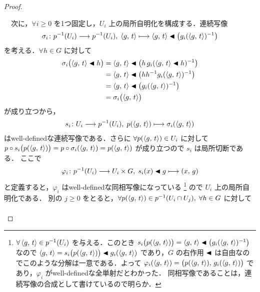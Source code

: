 \documentclass[TQFT_main]{subfiles}
\begin{document}
\begin{proof}
\begin{description}
        　次に，$\forall i \ge 0$ を1つ固定し，$U_i$ 上の局所自明化を構成する．連続写像
        \begin{align}
            \sigma_i \colon p^{-1}(U_i) \longrightarrow p^{-1}(U_i),\; \expval{g,\, t} \longmapsto \expval{g,\, t} \blacktriangleleft \bigl(g_i (\expval{g,\, t})^{-1}\bigr)
        \end{align}
        を考える．$\forall h \in G$ に対して
        \begin{align}
            \sigma_i \bigl( \expval{g,\, t} \blacktriangleleft h \bigr)  
            &= \expval{g,\, t} \blacktriangleleft \bigl(h\, g_i (\expval{g,\, t} \blacktriangleleft h)^{-1}\bigr) \\
            &= \expval{g,\, t} \blacktriangleleft \bigl(hh^{-1} g_i (\expval{g,\, t})^{-1}\bigr) \\
            &= \expval{g,\, t} \blacktriangleleft \bigl( g_i (\expval{g,\, t})^{-1}\bigr) \\
            &= \sigma_i \bigl( \expval{g,\, t} \bigr) 
        \end{align}
        が成り立つから，
        \begin{align}
            s_i \colon U_i \longrightarrow p^{-1}(U_i),\; p(\expval{g,\, t}) \longmapsto \sigma_i (\expval{g,\, t})
        \end{align}
        はwell-definedな連続写像である．さらに $\forall p(\expval{g,\, t}) \in U_i$ に対して $p \circ s_i \bigl( p(\expval{g,\, t}) \bigr) = p \circ \sigma_i(\expval{g,\, t}) = p(\expval{g,\, t})$ が成り立つので $s_i$ は局所切断である．
        ここで
        \begin{align}
            \varphi_i \colon p^{-1} (U_i) \longrightarrow U_i \times G,\; s_i (x) \blacktriangleleft g \longmapsto (x,\, g)
        \end{align}
        と定義すると，$\varphi_i$ はwell-definedな同相写像になっている
        \footnote{
            $\forall \expval{g,\, t} \in p^{-1}(U_i)$ を与える．このとき $s_i \bigl( p(\expval{g,\, t}) \bigr) = \expval{g,\, t} \blacktriangleleft \bigl( g_i(\expval{g,\, t})^{-1} \bigr)$ なので $\expval{g,\, t} = s_i \bigl( p(\expval{g,\, t}) \bigr) \blacktriangleleft g_i(\expval{g,\, t})$  であり，$G$ の右作用 $\blacktriangleleft$ は自由なのでこのような分解は一意である．よって $\varphi_i (\expval{g,\, t}) = \bigl( p(\expval{g,\, t}),\, g_i (\expval{g,\, t}) \bigr)$ であり，$\varphi_i$ がwell-definedな全単射だとわかった．  
            同相写像であることは，連続写像の合成として書けているので明らか．
        }
        ので $U_i$ 上の局所自明化である．
        別の $j \ge 0$ をとると，$\forall p(\expval{g,\, t}) \in p^{-1} (U_i \cap U_j),\; \forall h \in G$ に対して
        \begin{align}

\end{align}
\end{description}
\end{proof}
\end{document}
